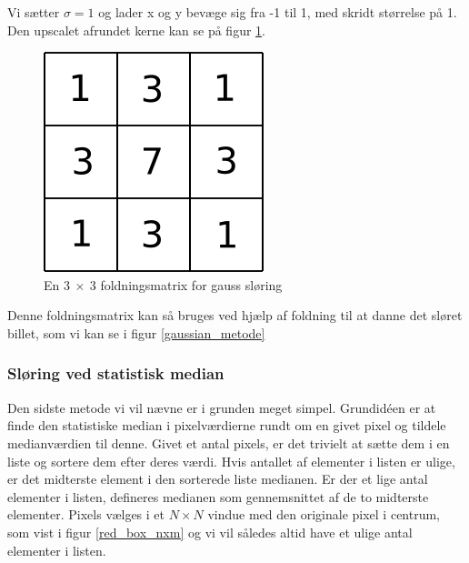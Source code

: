 {Vi sætter $\sigma = 1$ og lader x og y bevæge sig fra -1 til 1, med skridt størrelse
på 1. Den upscalet afrundet kerne kan se på figur \ref{gauss}.

\begin{figure}[h]
	\begin{center}
		\includegraphics[scale=0.5,angle=0]{afsnit/vores_implementation/billeder/sloering/gauss}
	\end{center}
	\caption[]{En $3~\times{}~3$ foldningsmatrix for gauss sløring}
	\label{gauss}
\end{figure}

Denne foldningsmatrix kan så bruges ved hjælp af foldning til at danne det sløret
billet, som vi kan se i figur \ref{gaussian_metode}

\subsubsection*{Sløring ved statistisk median}
Den sidste metode vi vil nævne er i grunden meget simpel. Grundidéen er
at finde den statistiske median i pixelværdierne rundt om en givet pixel
og tildele medianværdien til denne. Givet et antal pixels, er det
trivielt at sætte dem i en liste og sortere dem efter deres værdi. Hvis
antallet af elementer i listen er ulige, er det midterste element i den
sorterede liste medianen. Er der et lige antal elementer i listen,
defineres medianen som gennemsnittet af de to midterste elementer.
Pixels vælges i et $N \times N$ vindue med den originale pixel i
centrum, som vist i figur \ref{red_box_nxm} og vi vil således altid have
et ulige antal elementer i listen.

}
